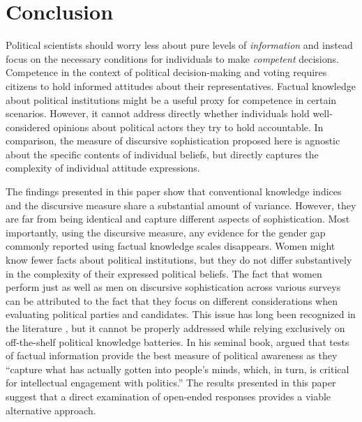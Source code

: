 \section{Conclusion}

Political scientists should worry less about pure levels of \textit{information} and instead focus on the necessary conditions for individuals to make \textit{competent} decisions. Competence in the context of political decision-making and voting requires citizens to hold informed attitudes about their representatives. Factual knowledge about political institutions might be a useful proxy for competence in certain scenarios. However, it cannot address directly whether individuals hold well-considered opinions about political actors they try to hold accountable. In comparison, the measure of discursive sophistication proposed here is agnostic about the specific contents of individual beliefs, but directly captures the complexity of individual attitude expressions.

The findings presented in this paper show that conventional knowledge indices and the discursive measure share a substantial amount of variance. However, they are far from being identical and capture different aspects of sophistication. Most importantly, using the discursive measure, any evidence for the gender gap commonly reported using factual knowledge scales disappears. Women might know fewer facts about political institutions, but they do not differ substantively in the complexity of their expressed political beliefs. The fact that women perform just as well as men on discursive sophistication across various surveys can be attributed to the fact that they focus on different considerations when evaluating political parties and candidates. This issue has long been recognized in the literature \citep[e.g.,][]{graber2001processing,dolan2011women}, but it cannot be properly addressed while relying exclusively on off-the-shelf political knowledge batteries. In his seminal book, \citet[21]{zaller1992nature} argued that tests of factual information provide the best measure of political awareness as they ``capture what has actually gotten into people's minds, which, in turn, is critical for intellectual engagement with politics.'' The results presented in this paper suggest that a direct examination of open-ended responses provides a viable alternative approach.